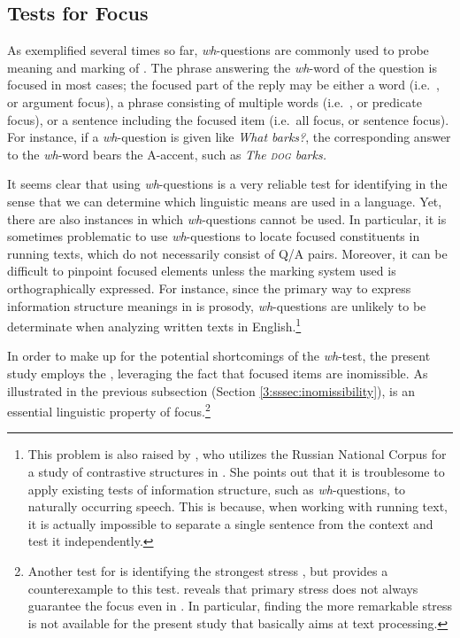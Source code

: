 \subsection{Tests for Focus}
\label{3:ssec:tests-focus}

As exemplified several times so far, \textit{wh}-questions are
commonly used to probe meaning and marking of 
\citep{lambrecht:96,gundel:99}. The phrase
answering the \textit{wh}-word of the question is focused in most
cases; the focused part of the reply may be either a word
(i.e.\ , or argument focus), a phrase consisting of
multiple words (i.e.\ , or predicate focus), or a
sentence including the focused item (i.e.\ all focus, or sentence
focus).  For instance, if a \textit{wh}-question is given like
\textit{What barks?}, the corresponding answer to the \textit{wh}-word
bears the A-accent, such as \textit{The \textsc{dog}
  barks.}


It seems clear that using \textit{wh}-questions is a very reliable
test for identifying  in the sense that we can determine which
linguistic means are used in a language. Yet, there are also instances
in which \textit{wh}-questions cannot be used. In particular, it is
sometimes problematic to use \textit{wh}-questions to locate focused
constituents in running texts, which do not necessarily consist of Q/A
pairs.  Moreover, it can be difficult to pinpoint focused elements
unless the marking system used is orthographically expressed. For
instance, since the primary way to express information structure
meanings in  is
prosody, \textit{wh}-questions
are unlikely to be determinate when analyzing written texts in
English.\footnote{This problem is also raised by \citet{gracheva:13},
  who utilizes the Russian National Corpus for a study of contrastive
  structures in . She points out that it is troublesome
  to apply existing tests of information structure, such as
  \textit{wh}-questions, to naturally occurring speech. This is
  because, when working with running text, it is actually impossible
  to separate a single sentence from the context and test it
  independently.}



In order to make up for the potential shortcomings of the
\textit{wh}-test, the present study employs the ,
leveraging the fact that focused items are inomissible. As illustrated
in the previous subsection (Section \ref{3:sssec:inomissibility}),
 is an essential linguistic property of
focus.\footnote{Another test for  is identifying the strongest
  stress \citep{rebuschi:tuller:99}, but \citet{casielles:04} provides
  a counterexample to this test. \citeauthor{casielles:04} reveals
  that primary stress does not always guarantee the focus even in
  . In particular, finding the more remarkable stress is
  not available for the present study that basically aims at text
  processing.}





